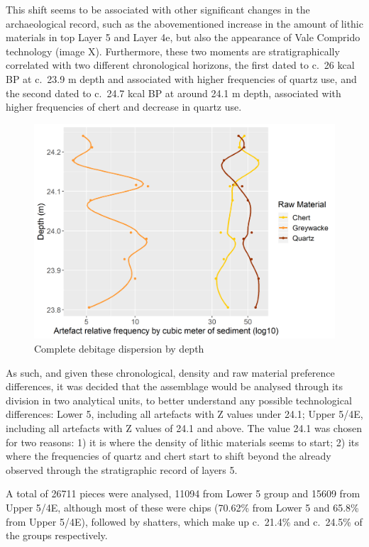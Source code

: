\documentclass[12pt,twoside]{reedthesis}
\begin{document}
This shift seems to be associated with other significant changes in the archaeological record, such as the abovementioned increase in the amount of lithic materials in top Layer 5 and Layer 4e, but also the appearance of Vale Comprido technology (image X). Furthermore, these two moments are stratigraphically correlated with two different chronological horizons, the first dated to c.~26 kcal BP at c.~23.9 m depth and associated with higher frequencies of quartz use, and the second dated to c.~24.7 kcal BP at around 24.1 m depth, associated with higher frequencies of chert and decrease in quartz use.
\begin{figure}
\includegraphics[width=1\linewidth]{figure/rm_cubic_meter} \caption{Complete debitage dispersion by depth}\label{fig:unnamed-chunk-11}
\end{figure}
As such, and given these chronological, density and raw material preference differences, it was decided that the assemblage would be analysed through its division in two analytical units, to better understand any possible technological differences: Lower 5, including all artefacts with Z values under 24.1; Upper 5/4E, including all artefacts with Z values of 24.1 and above. The value 24.1 was chosen for two reasons: 1) it is where the density of lithic materials seems to start; 2) its where the frequencies of quartz and chert start to shift beyond the already observed through the stratigraphic record of layers 5.

A total of 26711 pieces were analysed, 11094 from Lower 5 group and 15609 from Upper 5/4E, although most of these were chips (70.62\% from Lower 5 and 65.8\% from Upper 5/4E), followed by shatters, which make up c.~21.4\% and c.~24.5\% of the groups respectively.
\end{document}
